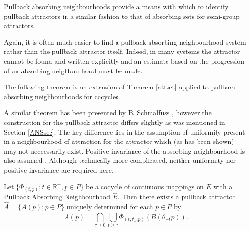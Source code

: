 Pullback absorbing neighbourhoods provide a means with which to
identify pullback attractors in a similar fashion to that of absorbing sets
for semi-group attractors.

Again, it is often much easier to find a pullback absorbing neighbourhood system
rather than the pullback attractor itself. Indeed, in many systems the attractor
cannot be found and written explicitly and an estimate based on the progression
of an absorbing neighbourhood must be made.

The following theorem is an extension of Theorem \ref{attset}
applied to pullback absorbing neighbourhoods for cocycles.

A similar theorem has been presented by B. Schmalfuss \cite{Sc99},
however the construction for the pullback attractor differs
slightly as was mentioned in Section \ref{ANSsec}. The key
difference lies in the assumption of uniformity present in a neighbourhood of
attraction for the attractor which (as has been shown) may not neccessarily 
exist.  Positive invariance of the absorbing
neighbourhood is also assumed \cite{Sc99}. Although technically more
complicated, neither uniformity nor positive invariance are required here.

\begin{therm}
  \label{abspat}
  Let $\{\Phi_{(t,p)};t \in \mathbb{R}^+, p \in P \}$ be a cocycle of
  continuous mappings on $E$ with a Pullback Absorbing Neighbourhood
  $\hat{B}$. Then there exists a pullback attractor $\hat{A} = \{ A(p); p
  \in P \}$ uniquely determined for each $p \in P$ by
  \begin{equation}
  \label{patfromabs}
  A(p) = \bigcap_{\tau \geq 0} \overline{\bigcup_{t \geq \tau}
            \Phi_{(t,\theta_{-t}p)}(B(\theta_{-t}p))}.
  \end{equation}
\end{therm}

